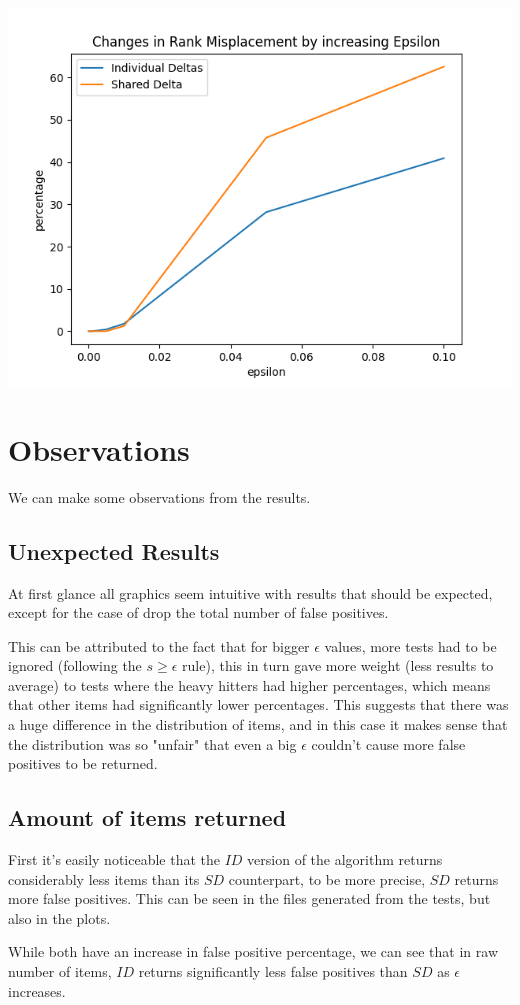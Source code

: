 \documentclass[...]{revdetua}
\begin{document}
\includegraphics[scale=0.5]{rank misplacement.png}

\section{Observations}
We can make some observations from the results.
\subsection{Unexpected Results}
At first glance all graphics seem intuitive with results that should be expected, except for the case of drop the total number of false positives.
\par
This can be attributed to the fact that for bigger $\epsilon$ values, more tests had to be ignored (following the $s \geq \epsilon$ rule), this in turn gave more weight (less results to average) to tests where the heavy hitters had higher percentages, which means that other items had significantly lower percentages. This suggests that there was a huge difference in the distribution of items, and in this case it makes sense that the distribution was so "unfair" that even a big $\epsilon$ couldn't cause more false positives to be returned.
\subsection{Amount of items returned}
First it's easily noticeable that the $ID$ version of the algorithm returns considerably less items than its $SD$ counterpart, to be more precise, $SD$ returns more false positives.
This can be seen in the files generated from the tests, but also in the plots. \par
While both have an increase in false positive percentage, we can see that in raw number of items, $ID$ returns significantly less false positives than $SD$ as $\epsilon$ increases.
\end{document}
